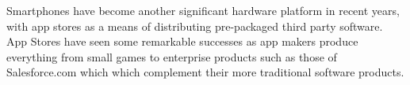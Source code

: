 Smartphones have become another significant hardware platform in recent years, with app stores as a means of distributing pre-packaged third party software.\autocite[]{TheAppEconomy}
App Stores have seen some remarkable successes as app makers produce everything from small games to enterprise products such as those of Salesforce.com which which complement their more traditional software products.\autocite[45]{TheAppEconomy}

